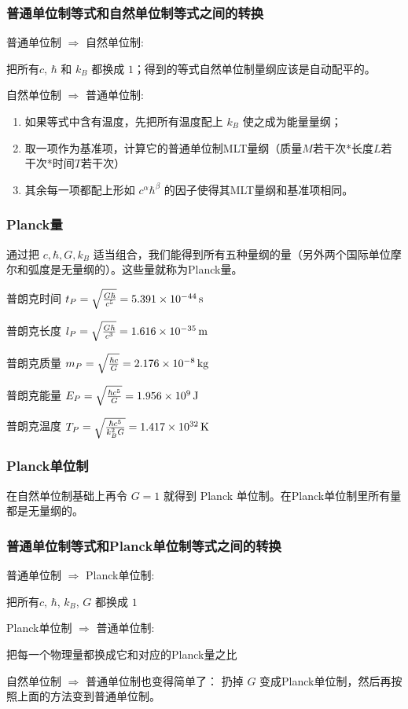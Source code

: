 \documentclass[CJK,13pt]{beamer}
\begin{document}
\begin{frame}
  \frametitle{普通单位制等式和自然单位制等式之间的转换}
  \bitem
\item{普通单位制 $\Rightarrow $ 自然单位制:

  把所有$c$, $\hbar$ 和 $k_B$ 都换成 $1$；得到的等式自然单位制量纲应该是自动配平的。}
\item{自然单位制 $\Rightarrow $ 普通单位制:
  \begin{enumerate}
  \item{如果等式中含有温度，先把所有温度配上 $k_B$ 使之成为能量量纲；}
  \item{取一项作为基准项，计算它的普通单位制MLT量纲（质量$M$若干次*长度$L$若干次*时间$T$若干次）}
  \item{其余每一项都配上形如 $c^\alpha\hbar^\beta$ 的因子使得其MLT量纲和基准项相同。}
\end{enumerate}}
  \eitem
\end{frame}

\begin{frame}
  \frametitle{Planck量}
  通过把 $c, \hbar, G, k_B$ 适当组合，我们能得到所有五种量纲的量（另外两个国际单位摩尔和弧度是无量纲的）。这些量就称为Planck量。

  普朗克时间 $t_P=\sqrt{\frac{G\hbar}{c^5}} = 5.391\times 10^{-44}\,\mathrm{s}$

  普朗克长度 $l_P=\sqrt{\frac{G\hbar}{c^3}} = 1.616\times 10^{-35}\,\mathrm{m}$  

  普朗克质量 $m_P = \sqrt{\frac{\hbar c}{G}} = 2.176\times 10^{-8}\,\mathrm{kg}$

  普朗克能量 $E_P = \sqrt{\frac{\hbar c^5}{G}} = 1.956\times 10^9 \,\mathrm{J}$

  普朗克温度 $T_P = \sqrt{\frac{\hbar c^5}{k_B^2G}} = 1.417 \times 10^{32}\,\mathrm{K}$
\end{frame}


\begin{frame}
  \frametitle{Planck单位制}
  在自然单位制基础上再令 $G=1$ 就得到 Planck 单位制。在Planck单位制里所有量都是无量纲的。

  \skiplines
  
\end{frame}


\begin{frame}
  \frametitle{普通单位制等式和Planck单位制等式之间的转换}
  \bitem
\item{普通单位制 $\Rightarrow $ Planck单位制:
  
  把所有$c$, $\hbar$, $k_B$, $G$ 都换成 $1$}
\item{Planck单位制 $\Rightarrow $ 普通单位制:
  
  把每一个物理量都换成它和对应的Planck量之比}
  \eitem

  \skiplines

  自然单位制 $\Rightarrow$ 普通单位制也变得简单了： 扔掉 $G$ 变成Planck单位制，然后再按照上面的方法变到普通单位制。
\end{frame}
\end{document}
